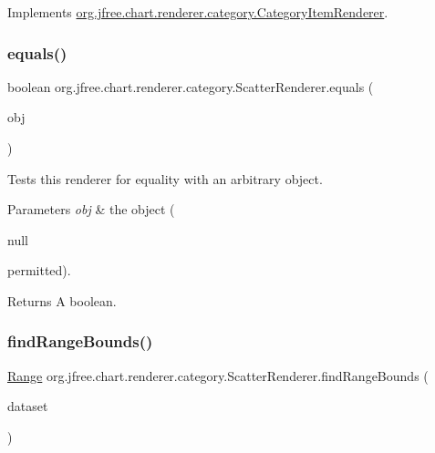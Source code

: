 Implements \mbox{\hyperlink{interfaceorg_1_1jfree_1_1chart_1_1renderer_1_1category_1_1_category_item_renderer_ac18a046a47d2b991ab2c968ce3363aea}{org.\+jfree.\+chart.\+renderer.\+category.\+Category\+Item\+Renderer}}.

\mbox{\label{classorg_1_1jfree_1_1chart_1_1renderer_1_1category_1_1_scatter_renderer_a19945c592de7149489e71dc4e498906a}} 
\subsubsection{\texorpdfstring{equals()}{equals()}}
{\footnotesize\ttfamily boolean org.\+jfree.\+chart.\+renderer.\+category.\+Scatter\+Renderer.\+equals (\begin{DoxyParamCaption}\item[{Object}]{obj }\end{DoxyParamCaption})}

Tests this renderer for equality with an arbitrary object.


\begin{DoxyParams}{Parameters}
{\em obj} & the object (
\begin{DoxyCode}
null 
\end{DoxyCode}
 permitted). \\
\hline
\end{DoxyParams}
\begin{DoxyReturn}{Returns}
A boolean. 
\end{DoxyReturn}
\mbox{\label{classorg_1_1jfree_1_1chart_1_1renderer_1_1category_1_1_scatter_renderer_aad055a28692567ef338b494aac70bb62}} 
\subsubsection{\texorpdfstring{find\+Range\+Bounds()}{findRangeBounds()}}
{\footnotesize\ttfamily \mbox{\hyperlink{classorg_1_1jfree_1_1data_1_1_range}{Range}} org.\+jfree.\+chart.\+renderer.\+category.\+Scatter\+Renderer.\+find\+Range\+Bounds (\begin{DoxyParamCaption}\item[{\mbox{\hyperlink{interfaceorg_1_1jfree_1_1data_1_1category_1_1_category_dataset}{Category\+Dataset}}}]{dataset }\end{DoxyParamCaption})}

